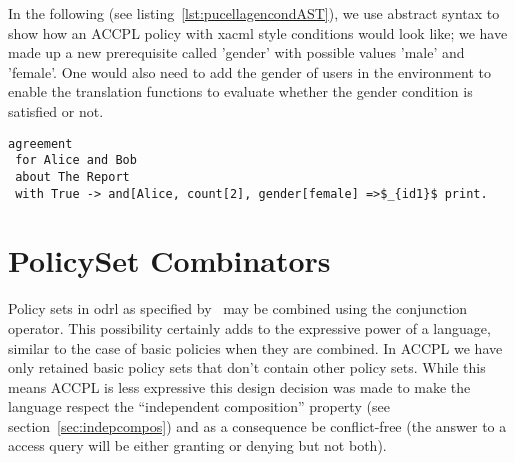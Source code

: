 In the following (see listing~\ref{lst:pucellagencondAST}), we use abstract syntax to show how an \ac{ACCPL} policy with \ac{xacml} style conditions would look like; we have made up a new prerequisite called 'gender' with possible values 'male' and 'female'. One would also need to add the gender of users in the environment to enable the translation functions to evaluate whether the gender condition is satisfied or not.

\lstset{language=Pucella2006}
\begin{minipage}[c]{0.95\textwidth}
\begin{lstlisting}[frame=single, caption={ACCPL Policy Using a General Condition}, label={lst:pucellagencondAST}, mathescape]
agreement
 for Alice and Bob 
 about The Report 
 with True -> and[Alice, count[2], gender[female] =>$_{id1}$ print.
\end{lstlisting}
\end{minipage} 




\section{PolicySet Combinators}\label{sec:policysetcombo}

Policy sets in \ac{odrl} as specified by~\cite{pucella2006} may be combined using the conjunction operator. This possibility certainly adds to the expressive power of a language, similar to the case of basic policies when they are combined. In \ac{ACCPL} we have only retained basic policy sets that don't contain other policy sets. While this means \ac{ACCPL} is less expressive this design decision was made to make the language respect the ``independent composition'' property (see section~\ref{sec:indepcompos}) and as a consequence be conflict-free (the answer to a access query will be either granting or denying but not both). 

